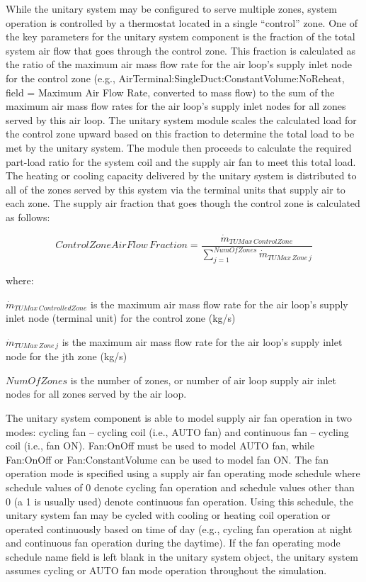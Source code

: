While the unitary system may be configured to serve multiple zones, system operation is controlled by a thermostat located in a single ``control'' zone. One of the key parameters for the unitary system component is the fraction of the total system air flow that goes through the control zone. This fraction is calculated as the ratio of the maximum air mass flow rate for the air loop's supply inlet node for the control zone (e.g., AirTerminal:SingleDuct:ConstantVolume:NoReheat, field = Maximum Air Flow Rate, converted to mass flow) to the sum of the maximum air mass flow rates for the air loop's supply inlet nodes for all zones served by this air loop. The unitary system module scales the calculated load for the control zone upward based on this fraction to determine the total load to be met by the unitary system. The module then proceeds to calculate the required part-load ratio for the system coil and the supply air fan to meet this total load. The heating or cooling capacity delivered by the unitary system is distributed to all of the zones served by this system via the terminal units that supply air to each zone. The supply air fraction that goes though the control zone is calculated as follows:

\begin{equation}
Control Zone Air Flow\,Fraction = \frac{{{{\dot m}_{TUMax\,ControlZone}}}}{{\sum\limits_{j = 1}^{NumOfZones} {{{\dot m}_{TUMax\,Zone\,j}}} }}
\end{equation}

where:

\({\dot m_{TUMax\,ControlledZone}}\) is the maximum air mass flow rate for the air loop's supply inlet node (terminal unit) for the control zone (kg/s)

\({\dot m_{TUMax\,Zone\,j}}\) is the maximum air mass flow rate for the air loop's supply inlet node for the jth zone (kg/s)

\(NumOfZones\) is the number of zones, or number of air loop supply air inlet nodes for all zones served by the air loop.

The unitary system component is able to model supply air fan operation in two modes: cycling fan -- cycling coil (i.e., AUTO fan) and continuous fan -- cycling coil (i.e., fan ON). Fan:OnOff must be used to model AUTO fan, while Fan:OnOff or Fan:ConstantVolume can be used to model fan ON. The fan operation mode is specified using a supply air fan operating mode schedule where schedule values of 0 denote cycling fan operation and schedule values other than 0 (a 1 is usually used) denote continuous fan operation. Using this schedule, the unitary system fan may be cycled with cooling or heating coil operation or operated continuously based on time of day (e.g., cycling fan operation at night and continuous fan operation during the daytime). If the fan operating mode schedule name field is left blank in the unitary system object, the unitary system assumes cycling or AUTO fan mode operation throughout the simulation.

